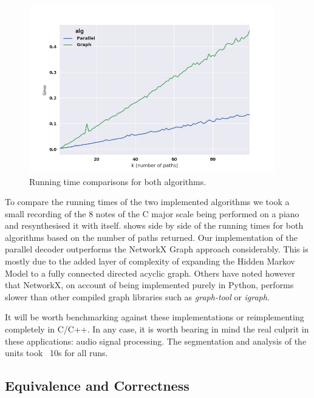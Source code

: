 {{{{{{{{\begin{figure}
	\begin{center}
		\includegraphics[width=0.95\textwidth]{ch05_pyconcat/figures/running_time.png}
	\end{center}
	\caption[Running time comparisons for both \textit{k}-Best algorithms]{Running time comparisons for both algorithms.}
	\label{fig:running_times}
\end{figure}

To compare the running times of the two implemented algorithms we took a small recording of the 8 notes of the C major scale being performed on a piano and resynthesised it with itself.  shows side by side of the running times for both algorithms based on the number of paths returned. Our implementation of the parallel decoder outperforms the NetworkX Graph approach considerably. This is mostly due to the added layer of complexity of expanding the Hidden Markov Model to a fully connected directed acyclic graph. Others have noted however that NetworkX, on account of being implemented purely in Python, performs slower than other compiled graph libraries such as \textit{graph-tool} or \textit{igraph}.

It will be worth benchmarking against these implementations or reimplementing completely in C/C++. In any case, it is worth bearing in mind the real culprit in these applications: audio signal processing. The segmentation and analysis of the units took ~10s for all runs.

\subsection{Equivalence and Correctness}

}}}}}}}}
